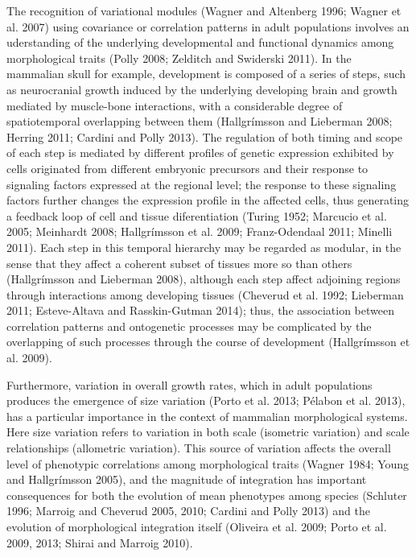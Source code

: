 \documentclass[12pt,]{article}
\begin{document}
The recognition of variational modules (Wagner and Altenberg 1996;
Wagner et al. 2007) using covariance or correlation patterns in adult
populations involves an uderstanding of the underlying developmental and
functional dynamics among morphological traits (Polly 2008; Zelditch and
Swiderski 2011). In the mammalian skull for example, development is
composed of a series of steps, such as neurocranial growth induced by
the underlying developing brain and growth mediated by muscle-bone
interactions, with a considerable degree of spatiotemporal overlapping
between them (Hallgrímsson and Lieberman 2008; Herring 2011; Cardini and
Polly 2013). The regulation of both timing and scope of each step is
mediated by different profiles of genetic expression exhibited by cells
originated from different embryonic precursors and their response to
signaling factors expressed at the regional level; the response to these
signaling factors further changes the expression profile in the affected
cells, thus generating a feedback loop of cell and tissue diferentiation
(Turing 1952; Marcucio et al. 2005; Meinhardt 2008; Hallgrímsson et al.
2009; Franz-Odendaal 2011; Minelli 2011). Each step in this temporal
hierarchy may be regarded as modular, in the sense that they affect a
coherent subset of tissues more so than others (Hallgrímsson and
Lieberman 2008), although each step affect adjoining regions through
interactions among developing tissues (Cheverud et al. 1992; Lieberman
2011; Esteve-Altava and Rasskin-Gutman 2014); thus, the association
between correlation patterns and ontogenetic processes may be
complicated by the overlapping of such processes through the course of
development (Hallgrímsson et al. 2009).

Furthermore, variation in overall growth rates, which in adult
populations produces the emergence of size variation (Porto et al. 2013;
Pélabon et al. 2013), has a particular importance in the context of
mammalian morphological systems. Here size variation refers to variation
in both scale (isometric variation) and scale relationships (allometric
variation). This source of variation affects the overall level of
phenotypic correlations among morphological traits (Wagner 1984; Young
and Hallgrímsson 2005), and the magnitude of integration has important
consequences for both the evolution of mean phenotypes among species
(Schluter 1996; Marroig and Cheverud 2005, 2010; Cardini and Polly 2013)
and the evolution of morphological integration itself (Oliveira et al.
2009; Porto et al. 2009, 2013; Shirai and Marroig 2010).
\end{document}
